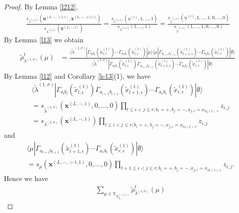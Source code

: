 \documentclass[11pt]{amsart}
\theoremstyle{plain}
\theoremstyle{definition}
\theoremstyle{remark}
\newcommand\si{\sigma}
\newcommand\YY{\mathbb{Y}}
\numberwithin{equation}{section}
\numberwithin{theorem}{section}
\numberwithin{figure}{section}
\begin{document}
\begin{proof}By Lemma \ref{l212}, 
\begin{align*}
\frac{s_{\lambda^{(i,\sigma)}}\left(\mathbf{u}^{(L,-,>t,i)},\mathbf{x}^{(L,-,\leq t,i)}\right)}{s_{\lambda^{(i,\sigma)}}\left(\mathbf{x}^{(L,-,i)}\right)}=\frac{s_{\lambda^{(i,\sigma)}}\left(\underline{u}^{(i)},1,\ldots,1\right)}{s_{\lambda^{(i,\sigma)}}\left(1,\ldots,1\right)}=\frac{s_{\tilde{\lambda}^{(i,\sigma)}}\left(\underline{u}^{(i)},1,\ldots,1,0,\ldots,0\right)}{s_{\tilde{\lambda}^{(i,\sigma)}}\left(1,\ldots,1,0,\ldots,0\right)}
\end{align*}
By Lemma \ref{l13} we obtain
\begin{align*}
\tilde{\rho}^t_{\lambda^{(1,\si)}}(\mu)&=\frac{\langle\tilde{\lambda}^{(1,\sigma)}| \Gamma_{a_lb_l}(\tilde{x}_{l,\epsilon}^{(1)})\cdots \Gamma_{a_{t}b_{t}}(\tilde{x}_{t,\epsilon}^{(1)})|\mu \rangle
\langle\mu| \Gamma_{a_{t+1}b_{t+1}}(\tilde{x}_{t+1,\epsilon}^{(1)})\cdots \Gamma_{a_{r}b_{r}}(\tilde{x}_{r,\epsilon}^{(1)})|\emptyset \rangle}{\langle\tilde{\lambda}^{(1,\sigma)}| \Gamma_{a_lb_l}(\tilde{x}_{l,\epsilon}^{(1)})\Gamma_{a_{l+1}b_{l+1}}(\tilde{x}_{l+1,\epsilon}^{(1)})\cdots \Gamma_{a_rb_r}(\tilde{x}_{r,\epsilon}^{(1)})|\emptyset \rangle}
\end{align*}
By Lemma \ref{l12} and Corollary \ref{lc13}(1), we have 
\begin{align*}
&\langle\tilde{\lambda}^{(1,\sigma)}| \Gamma_{a_lb_l}(\tilde{x}_{l,\epsilon}^{(1)})\Gamma_{a_{l+1}b_{l+1}}(\tilde{x}_{l+1,\epsilon}^{(1)})\cdots \Gamma_{a_rb_r}(\tilde{x}_{r,\epsilon}^{(1)})|\emptyset \rangle\\
&=s_{\tilde{\lambda}^{(1,\si)}}\left(\mathbf{x}^{(L,-,1)},0,\ldots,0\right)\prod_{l\leq i<j\leq r;b_i=+,b_j=-,x_{j,\epsilon}=x_{\sigma_0(1),\epsilon}}z_{i,j}\\
&=s_{\lambda^{(1,\si)}}\left(\mathbf{x}^{(L,-,1)}\right)\prod_{l\leq i<j\leq r;b_i=+,b_j=-,x_{j,\epsilon}=x_{\sigma_0(1),\epsilon}}z_{i,j}
\end{align*}
and
\begin{align*}
&\langle\mu| \Gamma_{a_{t+1}b_{t+1}}(\tilde{x}_{t+1,\epsilon}^{(1)})\cdots \Gamma_{a_{r}b_{r}}(\tilde{x}_{r,\epsilon}^{(1)})|\emptyset \rangle\\
&=s_{\mu}\left(\mathbf{x}^{(L,-,>t,1)},0,\ldots,0\right)\prod_{t+1\leq i<j\leq r;b_i=+,b_j=-,x_{j,\epsilon}=x_{\sigma_0(1),\epsilon}}z_{i,j}.
\end{align*}
Hence we have
\begin{align*}
&\sum_{\mu\in \YY_{N_{L,-}^{(>t,\epsilon)}}}\tilde{\rho}^t_{\lambda^{(1,\si)}}(\mu)

\end{align*}
\end{proof}
\end{document}
